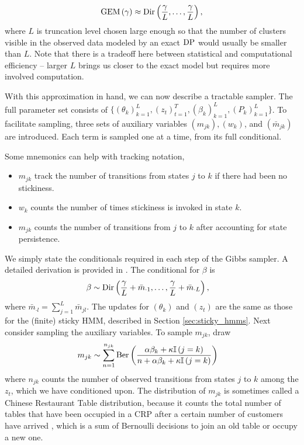 \begin{align*}
  \text{GEM}\left(\gamma\right) \approx \textnormal{Dir}\left(\frac{\gamma}{L}, \dots, \frac{\gamma}{L}\right),
\end{align*}
where $L$ is truncation level chosen large enough so that the number of clusters
visible in the observed data modeled by an exact $\textnormal{DP}$ would usually be smaller
than $L$. Note that there is a tradeoff here between statistical and
computational efficiency -- larger $L$ brings us closer to the exact model but
requires more involved computation.

With this approximation in hand, we can now describe a tractable sampler. The
full parameter set consists of $\{\left(\theta_k\right)_{k = 1}^{L},
\left(z_t\right)_{t = 1}^{T}, \left(\beta_{k}\right)_{k = 1}^{L},
\left(P_{k}\right)_{k = 1}^{L} \}$. To facilitate sampling, three sets of
auxiliary variables $\left(m_{jk}\right), \left(w_k\right)$, and
  $\left(\bar{m}_{jk}\right)$ are introduced. Each term is sampled one at a
  time, from its full conditional.

  Some mnemonics can help with tracking notation,
\begin{itemize}
\item $m_{jk}$ track the number of transitions from states $j$ to $k$ if there
  had been no stickiness.
\item $w_k$ counts the number of times stickiness is invoked in state $k$.
\item $m_{jk}$ counts the number of transitions from $j$ to $k$ after accounting
  for state persistence.
\end{itemize}

We simply state the conditionals required in each step of the Gibbs sampler. A
detailed derivation is provided in \citep{fox2009bayesian}. The conditional for
$\beta$ is
\begin{align*}
  \beta &\sim \textnormal{Dir}\left(\frac{\gamma}{L} + \bar{m}_{\cdot 1}, \dots, \frac{\gamma}{L} + \bar{m}_{\cdot L}\right),
\end{align*}
where $\bar{m}_{\cdot l} = \sum_{j = 1}^{L} \bar{m}_{jl}$. The updates for
$\left(\theta_k\right)$ and $\left(z_t\right)$ are the same as those for the
(finite) sticky HMM, described in Section \ref{sec:sticky_hmms}. Next consider
sampling the auxiliary variables. To sample $m_{jk}$, draw
\begin{align*}
  m_{jk} &\sim \sum_{n = 1}^{n_{jk}} \textnormal{Ber}\left(\frac{\alpha \beta_{k} + \kappa\mathbb{I}\left({j = k}\right)}{n + \alpha \beta_{k} + \kappa \mathbb{I}\left({j = k}\right)}\right)
\end{align*}
where $n_{jk}$ counts the number of observed transitions from states $j$ to $k$
among the $z_{t}$, which we have conditioned upon. The distribution of $m_{jk}$
is sometimes called a Chinese Restaurant Table distribution, because it counts
the total number of tables that have been occupied in a CRP after a certain
number of customers have arrived \citep{zhou2012augment}, which is a sum of
Bernoulli decisions to join an old table or occupy a new one.

